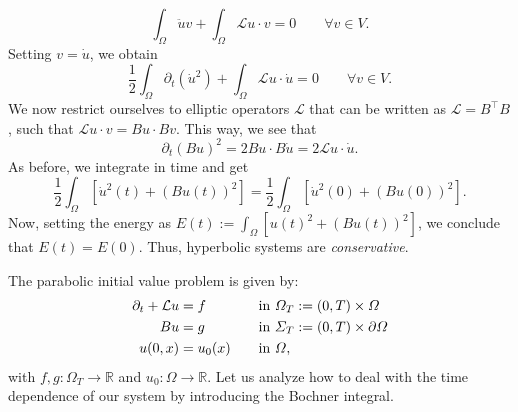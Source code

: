 \documentclass{article}
\newcommand{\R}{\mathbb{R}}
\begin{document}
\begin{enumerate}
\begin{equation*}
        \int_\Omega \ddot{u}v + \int_\Omega \mathcal{L}u\cdot v = 0 \qquad \forall v\in V.
    \end{equation*}
    Setting $v=\dot{u}$, we obtain
    \begin{equation*}
        \frac{1}{2}\int_\Omega \partial_t (\dot{u}^2) + \int_\Omega \mathcal{L}u\cdot \dot{u} = 0 \qquad \forall v\in V.
    \end{equation*}
    We now restrict ourselves to elliptic operators $\mathcal{L}$ that can be written as $\mathcal{L}=B^\top B$, such that $\mathcal{L}u\cdot v = Bu\cdot Bv$. This way, we see that 
    \begin{equation*}
        \partial_t (Bu)^2 = 2Bu \cdot B\dot{u} = 2\mathcal{L}u\cdot \dot{u}.
    \end{equation*}
    As before, we integrate in time and get 
    \begin{equation*}
        \frac{1}{2} \int_\Omega \left[\dot{u}^2(t) + (Bu(t))^2\right] = \frac{1}{2} \int_\Omega \left[\dot{u}^2(0) + (Bu(0))^2\right].
    \end{equation*}
    Now, setting the energy as $E(t) := \int_\Omega \left[u(t)^2 + (Bu(t))^2\right]$, we conclude that $E(t) = E(0)$. Thus, hyperbolic systems are \textit{conservative}.
\end{enumerate}
The parabolic initial value problem is given by:
\begin{equation*}
    \begin{aligned}
        \partial_t + \mathcal{L}u &= f &&\quad \text{in }\Omega_T := (0,T) \times \Omega\\
        \hfill Bu &= g &&\quad \text{in }\Sigma_T := (0,T) \times \partial\Omega\\
        \hfill u(0,x)&= u_0(x) &&\quad \text{in }\Omega,
    \end{aligned}
\end{equation*}
with $f,g:\Omega_T\to \R$ and $u_0:\Omega\to\R$. Let us analyze how to deal with the time dependence of our system by introducing the Bochner integral.
\end{document}
